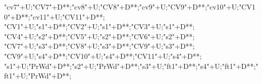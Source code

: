 \begin{multicols}{2}
\begin{exe}
{\begin{xlist}
{				"cv7"+U;"CV7"+D**\dir{-};"cv8"+U;"CV8"+D**\dir{-};"cv9"+U;"CV9"+D**\dir{-};"cv10"+U;"CV10"+D**\dir{-};"cv11"+U;"CV11"+D**\dir{-};
				"CV1"+U;"s1"+D**\dir{-};"CV2"+U;"s1"+D**\dir{-};"CV3"+U;"s1"+D**\dir{-};
				"CV4"+U;"s2"+D**\dir{-};"CV5"+U;"s2"+D**\dir{-};"CV6"+U;"s2"+D**\dir{-};
				"CV7"+U;"s3"+D**\dir{-};"CV8"+U;"s3"+D**\dir{-};"CV9"+U;"s3"+D**\dir{-};
				"CV9"+U;"s4"+D**\dir{-};"CV10"+U;"s4"+D**\dir{-};"CV11"+U;"s4"+D**\dir{-};
				"s1"+U;"PrWd"+D**\dir{-};"s2"+U;"PrWd"+D**\dir{-};"s3"+U;"ft1"+D**\dir{-};"s4"+U;"ft1"+D**\dir{-};"ft1"+U;"PrWd"+D**\dir{-};
			\endxy}
		\end{xlist}}
	\end{exe}
\end{multicols}
 
